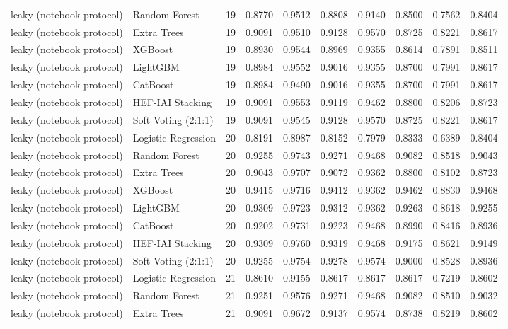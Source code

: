 \begin{tabular}{llrrrrrrrr}
leaky (notebook protocol) & Random Forest & 19 & 0.8770 & 0.9512 & 0.8808 & 0.9140 & 0.8500 & 0.7562 & 0.8404 \\
leaky (notebook protocol) & Extra Trees & 19 & 0.9091 & 0.9510 & 0.9128 & 0.9570 & 0.8725 & 0.8221 & 0.8617 \\
leaky (notebook protocol) & XGBoost & 19 & 0.8930 & 0.9544 & 0.8969 & 0.9355 & 0.8614 & 0.7891 & 0.8511 \\
leaky (notebook protocol) & LightGBM & 19 & 0.8984 & 0.9552 & 0.9016 & 0.9355 & 0.8700 & 0.7991 & 0.8617 \\
leaky (notebook protocol) & CatBoost & 19 & 0.8984 & 0.9490 & 0.9016 & 0.9355 & 0.8700 & 0.7991 & 0.8617 \\
leaky (notebook protocol) & HEF-IAI Stacking & 19 & 0.9091 & 0.9553 & 0.9119 & 0.9462 & 0.8800 & 0.8206 & 0.8723 \\
leaky (notebook protocol) & Soft Voting (2:1:1) & 19 & 0.9091 & 0.9545 & 0.9128 & 0.9570 & 0.8725 & 0.8221 & 0.8617 \\
leaky (notebook protocol) & Logistic Regression & 20 & 0.8191 & 0.8987 & 0.8152 & 0.7979 & 0.8333 & 0.6389 & 0.8404 \\
leaky (notebook protocol) & Random Forest & 20 & 0.9255 & 0.9743 & 0.9271 & 0.9468 & 0.9082 & 0.8518 & 0.9043 \\
leaky (notebook protocol) & Extra Trees & 20 & 0.9043 & 0.9707 & 0.9072 & 0.9362 & 0.8800 & 0.8102 & 0.8723 \\
leaky (notebook protocol) & XGBoost & 20 & 0.9415 & 0.9716 & 0.9412 & 0.9362 & 0.9462 & 0.8830 & 0.9468 \\
leaky (notebook protocol) & LightGBM & 20 & 0.9309 & 0.9723 & 0.9312 & 0.9362 & 0.9263 & 0.8618 & 0.9255 \\
leaky (notebook protocol) & CatBoost & 20 & 0.9202 & 0.9731 & 0.9223 & 0.9468 & 0.8990 & 0.8416 & 0.8936 \\
leaky (notebook protocol) & HEF-IAI Stacking & 20 & 0.9309 & 0.9760 & 0.9319 & 0.9468 & 0.9175 & 0.8621 & 0.9149 \\
leaky (notebook protocol) & Soft Voting (2:1:1) & 20 & 0.9255 & 0.9754 & 0.9278 & 0.9574 & 0.9000 & 0.8528 & 0.8936 \\
leaky (notebook protocol) & Logistic Regression & 21 & 0.8610 & 0.9155 & 0.8617 & 0.8617 & 0.8617 & 0.7219 & 0.8602 \\
leaky (notebook protocol) & Random Forest & 21 & 0.9251 & 0.9576 & 0.9271 & 0.9468 & 0.9082 & 0.8510 & 0.9032 \\
leaky (notebook protocol) & Extra Trees & 21 & 0.9091 & 0.9672 & 0.9137 & 0.9574 & 0.8738 & 0.8219 & 0.8602 \\

\end{tabular}
